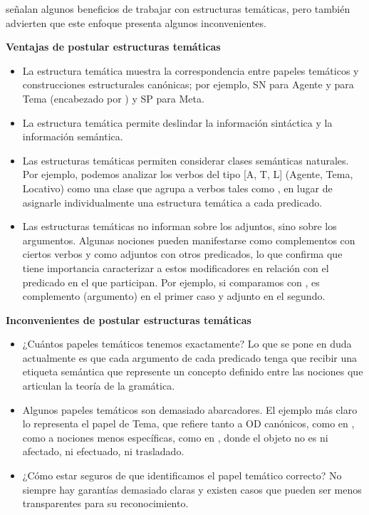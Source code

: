\begin{recuadro}
\textcite{bosque2009} señalan algunos beneficios de trabajar con estructuras
temáticas, pero también advierten que este enfoque presenta algunos
inconvenientes.

\medskip\textbf{Ventajas de postular estructuras temáticas}
\begin{itemize}
  \item La estructura temática muestra la correspondencia entre papeles
        temáticos y construcciones estructurales canónicas; por ejemplo, SN para
        Agente y para Tema (encabezado por ) y SP para Meta.
  \item La estructura temática permite deslindar la información sintáctica y la
        información semántica.
  \item Las estructuras temáticas permiten considerar clases semánticas
        naturales. Por ejemplo, podemos analizar los verbos del tipo [A, T, L]
        (Agente, Tema, Locativo) como una clase que agrupa a verbos tales como
        , en lugar de asignarle
        individualmente una estructura temática a cada predicado.
  \item Las estructuras temáticas no informan sobre los adjuntos, sino sobre los
        argumentos. Algunas nociones pueden manifestarse como complementos con
        ciertos verbos y como adjuntos con otros predicados, lo que confirma que
        tiene importancia caracterizar a estos modificadores en relación con el
        predicado en el que participan. Por ejemplo, si comparamos
         con ,  es complemento
        (argumento) en el primer caso y adjunto en el segundo.
\end{itemize}

\textbf{Inconvenientes de postular estructuras temáticas}
\begin{itemize}
  \item ¿Cuántos papeles temáticos tenemos exactamente? Lo que se pone en duda
        actualmente es que cada argumento de cada predicado tenga que recibir
        una etiqueta semántica que represente un concepto definido entre las
        nociones que articulan la teoría de la gramática.
  \item Algunos papeles temáticos son demasiado abarcadores. El ejemplo más
        claro lo representa el papel de Tema, que refiere tanto a OD canónicos,
        como en , como a nociones menos específicas,
        como en , donde el objeto no es ni
        afectado, ni efectuado, ni trasladado.
  \item ¿Cómo estar seguros de que identificamos el papel temático correcto? No
        siempre hay garantías demasiado claras y existen casos que pueden ser
        menos transparentes para su reconocimiento.
\end{itemize}
\end{recuadro}

